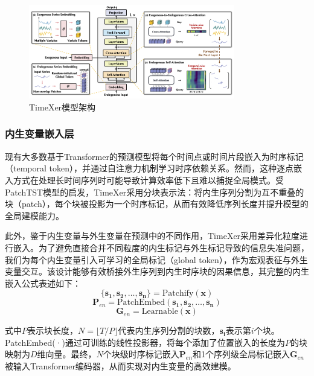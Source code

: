\documentclass[12pt]{article}
\begin{document}
\begin{figure}
    \centering
    \includegraphics[width=0.8\textwidth]{image/structure.png}
    \caption{TimeXer模型架构\cite{TimeXer}}
    \label{fig:TimeXer}
\end{figure}

\subsubsection*{内生变量嵌入层}
现有大多数基于Transformer的预测模型将每个时间点或时间片段嵌入为时序标记（temporal token），并通过自注意力机制学习时序依赖关系。然而，这种逐点嵌入方式在处理长时间序列时可能导致计算效率低下且难以捕捉全局模式。受PatchTST模型\cite{PatchTST}的启发，TimeXer采用分块表示法：将内生序列分割为互不重叠的块（patch），每个块被投影为一个时序标记，从而有效降低序列长度并提升模型的全局建模能力。

此外，鉴于内生变量与外生变量在预测中的不同作用，TimeXer采用差异化粒度进行嵌入。为了避免直接合并不同粒度的内生标记与外生标记导致的信息失准问题，我们为每个内生变量引入可学习的全局标记（global token），作为宏观表征与外生变量交互。该设计能够有效桥接外生序列到内生时序块的因果信息，其完整的内生嵌入公式表述如下：
\begin{equation*}
    \{\mathbf{s_1}, \mathbf{s_2}, \ldots, \mathbf{s_n}\} = \text{Patchify}(\mathbf{x})
\end{equation*}
\begin{equation}
    \mathbf{P}_{en} = \text{PatchEmbed}(\mathbf{s_1}, \mathbf{s_2}, \ldots, \mathbf{s_n})
\end{equation}
\begin{equation*}
    \mathbf{G}_{en} = \text{Learnable}(\mathbf{x})
\end{equation*}

式中$P$表示块长度，$N=\lfloor T/P\rfloor$代表内生序列分割的块数，$\mathbf{s_i}$表示第$i$个块。PatchEmbed(·)通过可训练的线性投影器，将每个添加了位置嵌入的长度为$P$的块映射为$D$维向量。最终，$N$个块级时序标记嵌入$\mathbf{P}_{en}$和1个序列级全局标记嵌入$\mathbf{G}_{en}$被输入Transformer编码器，从而实现对内生变量的高效建模。
\end{document}
